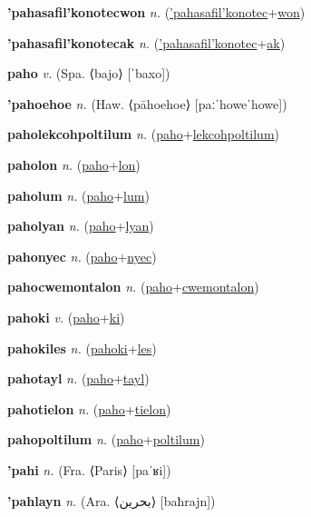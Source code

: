 \textbf{\hypertarget{'pahasafil'konotecwon}{'pahasafil'konotecwon}} \textit{n.} (\hyperlink{'pahasafil'konotec}{'pahasafil'konotec}+\allowbreak \hyperlink{won}{won})


\textbf{\hypertarget{'pahasafil'konotecak}{'pahasafil'konotecak}} \textit{n.} (\hyperlink{'pahasafil'konotec}{'pahasafil'konotec}+\allowbreak \hyperlink{ak}{ak})


\textbf{\hypertarget{paho}{paho}} \textit{v.} (Spa. ⟨bajo⟩ [ˈbaxo])


\textbf{\hypertarget{'pahoehoe}{'pahoehoe}} \textit{n.} (Haw. ⟨pāhoehoe⟩ [paːˈhoweˈhowe])


\textbf{\hypertarget{paholekcohpoltilum}{paholekcohpoltilum}} \textit{n.} (\hyperlink{paho}{paho}+\allowbreak \hyperlink{lekcohpoltilum}{lekcohpoltilum})


\textbf{\hypertarget{paholon}{paholon}} \textit{n.} (\hyperlink{paho}{paho}+\allowbreak \hyperlink{lon}{lon})


\textbf{\hypertarget{paholum}{paholum}} \textit{n.} (\hyperlink{paho}{paho}+\allowbreak \hyperlink{lum}{lum})


\textbf{\hypertarget{paholyan}{paholyan}} \textit{n.} (\hyperlink{paho}{paho}+\allowbreak \hyperlink{lyan}{lyan})


\textbf{\hypertarget{pahonyec}{pahonyec}} \textit{n.} (\hyperlink{paho}{paho}+\allowbreak \hyperlink{nyec}{nyec})


\textbf{\hypertarget{pahocwemontalon}{pahocwemontalon}} \textit{n.} (\hyperlink{paho}{paho}+\allowbreak \hyperlink{cwemontalon}{cwemontalon})


\textbf{\hypertarget{pahoki}{pahoki}} \textit{v.} (\hyperlink{paho}{paho}+\allowbreak \hyperlink{ki}{ki})


\textbf{\hypertarget{pahokiles}{pahokiles}} \textit{n.} (\hyperlink{pahoki}{pahoki}+\allowbreak \hyperlink{les}{les})


\textbf{\hypertarget{pahotayl}{pahotayl}} \textit{n.} (\hyperlink{paho}{paho}+\allowbreak \hyperlink{tayl}{tayl})


\textbf{\hypertarget{pahotielon}{pahotielon}} \textit{n.} (\hyperlink{paho}{paho}+\allowbreak \hyperlink{tielon}{tielon})


\textbf{\hypertarget{pahopoltilum}{pahopoltilum}} \textit{n.} (\hyperlink{paho}{paho}+\allowbreak \hyperlink{poltilum}{poltilum})


\textbf{\hypertarget{'pahi}{'pahi}} \textit{n.} (Fra. ⟨Paris⟩ [paˈʁi])


\textbf{\hypertarget{'pahlayn}{'pahlayn}} \textit{n.} (Ara. ⟨{\arabics{}بحرين‎}⟩ [baħrajn])



